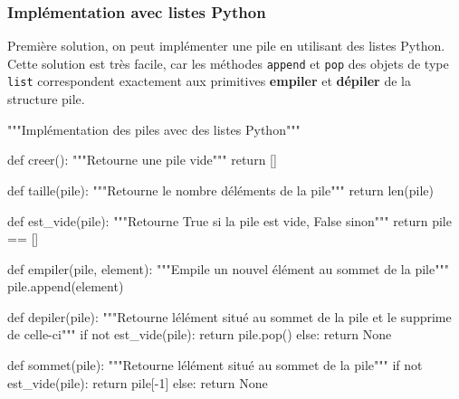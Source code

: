 \documentclass[
  letterpaper,
  DIV=11,
  numbers=noendperiod]{scrartcl}
\newenvironment{Shaded}{\begin{snugshade}}{\end{snugshade}}
\newcommand{\BuiltInTok}[1]{\textcolor[rgb]{0.00,0.23,0.31}{#1}}
\newcommand{\CommentTok}[1]{\textcolor[rgb]{0.37,0.37,0.37}{#1}}
\newcommand{\ControlFlowTok}[1]{\textcolor[rgb]{0.00,0.23,0.31}{#1}}
\newcommand{\DecValTok}[1]{\textcolor[rgb]{0.68,0.00,0.00}{#1}}
\newcommand{\KeywordTok}[1]{\textcolor[rgb]{0.00,0.23,0.31}{#1}}
\newcommand{\NormalTok}[1]{\textcolor[rgb]{0.00,0.23,0.31}{#1}}
\newcommand{\OperatorTok}[1]{\textcolor[rgb]{0.37,0.37,0.37}{#1}}
\newcommand{\VariableTok}[1]{\textcolor[rgb]{0.07,0.07,0.07}{#1}}
\begin{document}
\hypertarget{impluxe9mentation-avec-listes-python}{%
\subsubsection{Implémentation avec listes
Python}\label{impluxe9mentation-avec-listes-python}}

Première solution, on peut implémenter une pile en utilisant des listes
Python. Cette solution est très facile, car les méthodes \texttt{append}
et \texttt{pop} des objets de type \texttt{list} correspondent
exactement aux primitives \textbf{empiler} et \textbf{dépiler} de la
structure pile.

\begin{Shaded}
\begin{Highlighting}[]
\CommentTok{"""Implémentation des piles avec des listes Python"""}


\KeywordTok{def}\NormalTok{ creer():}
    \CommentTok{"""Retourne une pile vide"""}
    \ControlFlowTok{return}\NormalTok{ []}


\KeywordTok{def}\NormalTok{ taille(pile):}
    \CommentTok{"""Retourne le nombre d\textquotesingle{}éléments de la pile"""}
    \ControlFlowTok{return} \BuiltInTok{len}\NormalTok{(pile)}


\KeywordTok{def}\NormalTok{ est\_vide(pile):}
    \CommentTok{"""Retourne True si la pile est vide, False sinon"""}
    \ControlFlowTok{return}\NormalTok{ pile }\OperatorTok{==}\NormalTok{ []}


\KeywordTok{def}\NormalTok{ empiler(pile, element):}
    \CommentTok{"""Empile un nouvel élément au sommet de la pile"""}
\NormalTok{    pile.append(element)}


\KeywordTok{def}\NormalTok{ depiler(pile):}
    \CommentTok{"""Retourne l\textquotesingle{}élément situé au sommet de la pile}
\CommentTok{    et le supprime de celle{-}ci"""}
    \ControlFlowTok{if} \KeywordTok{not}\NormalTok{ est\_vide(pile):}
        \ControlFlowTok{return}\NormalTok{ pile.pop()}
    \ControlFlowTok{else}\NormalTok{:}
        \ControlFlowTok{return} \VariableTok{None}


\KeywordTok{def}\NormalTok{ sommet(pile):}
    \CommentTok{"""Retourne l\textquotesingle{}élément situé au sommet de la pile"""}
    \ControlFlowTok{if} \KeywordTok{not}\NormalTok{ est\_vide(pile):}
        \ControlFlowTok{return}\NormalTok{ pile[}\OperatorTok{{-}}\DecValTok{1}\NormalTok{]}
    \ControlFlowTok{else}\NormalTok{:}
        \ControlFlowTok{return} \VariableTok{None}
\end{Highlighting}
\end{Shaded}
\end{document}
